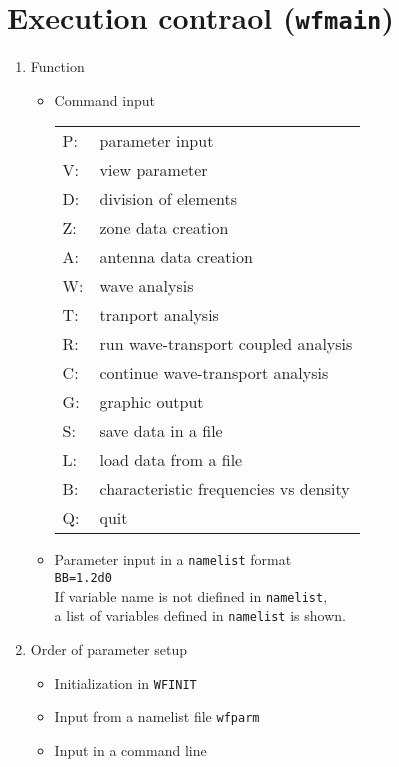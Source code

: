 \section{Execution contraol ({\tt wfmain})}
\begin{enumerate}
\item
Function
\begin{itemize}
\item
Command input

\qquad
\begin{tabular}{ll}
P:& parameter input \\
V:& view parameter \\
D:& division of elements \\
Z:& zone data creation \\
A:& antenna data creation \\
W:& wave analysis \\
T:& tranport analysis \\
R:& run wave-transport coupled analysis \\
C:& continue wave-transport analysis \\
G:& graphic output \\
S:& save data in a file \\
L:& load data from a file \\
B:& characteristic frequencies vs density \\
Q:& quit
\end{tabular}
\item
Parameter input in a {\tt namelist} format
\\\qquad \verb/BB=1.2d0/
\\\qquad If variable name is not diefined in {\tt namelist},
\\\qquad a list of variables defined in {\tt namelist} is shown.
\end{itemize}

\item
Order of parameter setup
\begin{itemize}
\item
Initialization in {\tt WFINIT}
\item
Input from a namelist file {\tt wfparm}
\item
Input in a command line
\end{itemize}
\end{enumerate}
